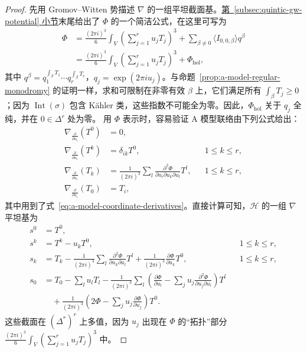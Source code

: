 \begin{proof}
先用 Gromov--Witten 势描述 $\nabla$ 的一组平坦截面基。\hyperref[subsec:quintic-gw-potential]{第~\ref*{subsec:quintic-gw-potential} 小节}末尾给出了 $\Phi$ 的一个简洁公式，在这里可写为
\begin{equation}\label{eq:a-model-potential}
\begin{aligned}
\Phi&=\frac{(2\pi i)^3}{6}\int_V\left(\sum_{j=1}^ru_jT_j\right)^3
+\sum_{\beta\ne0}\langle I_{0,0,\beta}\rangle q^\beta\\
&=\frac{(2\pi i)^3}{6}\int_V\left(\sum_{j=1}^ru_jT_j\right)^3+\Phi_{\mathrm{hol}},
\end{aligned}
\end{equation}
其中 $q^\beta=q_1^{\int_\beta T_1}\cdots q_r^{\int_\beta T_r}$，$q_j=\exp(2\pi iu_j)$。与命题~\ref{prop:a-model-regular-monodromy} 的证明一样，求和可限制在非零有效 $\beta$ 上，它们满足所有 $\int_\beta T_j\ge0$；因为 $\operatorname{Int}(\sigma)$ 包含 Kähler 类，这些指数不可能全为零。因此，$\Phi_{\mathrm{hol}}$ 关于 $q_j$ 全纯，并在 $0\in\Delta^r$ 处为零。
用 $\Phi$ 表示时，容易验证 A 模型联络由下列公式给出：
\begin{equation}\label{eq:a-model-threefold-connection}
\begin{aligned}
\nabla_{\frac{\partial}{\partial u_i}}(T^0)&=0,\\
\nabla_{\frac{\partial}{\partial u_i}}(T^k)&=\delta_{ik}T^0,&&1\le k\le r,\\
\nabla_{\frac{\partial}{\partial u_i}}(T_k)&=\frac1{(2\pi i)^3}\sum_l\frac{\partial^3\Phi}{\partial u_i\partial u_k\partial u_l}T^l,&&1\le k\le r,\\
\nabla_{\frac{\partial}{\partial u_i}}(T_0)&=T_i,
\end{aligned}
\end{equation}
其中用到了式~\eqref{eq:a-model-coordinate-derivatives}。直接计算可知，$\mathcal H$ 的一组 $\nabla$ 平坦基为
\begin{equation}\label{eq:a-model-flat-sections-threefold}
\begin{aligned}
s^0&=T^0,\\
s^k&=T^k-u_kT^0,&&1\le k\le r,\\
s_k&=T_k-\frac1{(2\pi i)^3}\sum_l\frac{\partial^2\Phi}{\partial u_k\partial u_l}T^l
+\frac1{(2\pi i)^3}\frac{\partial\Phi}{\partial u_k}T^0,&&1\le k\le r,\\
s_0&=T_0-\sum_lu_lT_l
-\frac1{(2\pi i)^3}\sum_l\left(\frac{\partial\Phi}{\partial u_l}-\sum_ju_j\frac{\partial^2\Phi}{\partial u_j\partial u_l}\right)T^l\\
&\quad+\frac1{(2\pi i)^3}\left(2\Phi-\sum_ju_j\frac{\partial\Phi}{\partial u_j}\right)T^0.
\end{aligned}
\end{equation}
这些截面在 $(\Delta^*)^r$ 上多值，因为 $u_j$ 出现在 $\Phi$ 的“拓扑”部分 $\frac{(2\pi i)^3}{6}\int_V(\sum_{j=1}^ru_jT_j)^3$ 中。


\end{proof}
